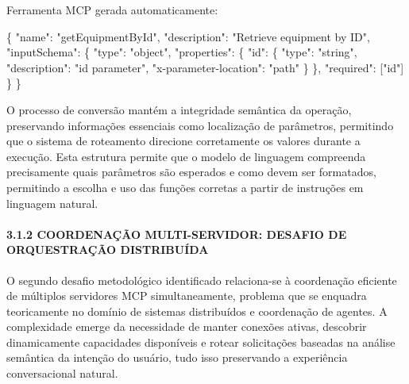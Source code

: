 \documentclass[
]{article}
\newenvironment{Shaded}{}{}
\newcommand{\DataTypeTok}[1]{\textcolor[rgb]{0.56,0.13,0.00}{#1}}
\newcommand{\FunctionTok}[1]{\textcolor[rgb]{0.02,0.16,0.49}{#1}}
\newcommand{\OtherTok}[1]{\textcolor[rgb]{0.00,0.44,0.13}{#1}}
\newcommand{\StringTok}[1]{\textcolor[rgb]{0.25,0.44,0.63}{#1}}
\begin{document}
Ferramenta MCP gerada automaticamente:

\begin{Shaded}
\begin{Highlighting}[]
\FunctionTok{\{}
  \DataTypeTok{"name"}\FunctionTok{:} \StringTok{"getEquipmentById"}\FunctionTok{,}
  \DataTypeTok{"description"}\FunctionTok{:} \StringTok{"Retrieve equipment by ID"}\FunctionTok{,}
  \DataTypeTok{"inputSchema"}\FunctionTok{:} \FunctionTok{\{}
    \DataTypeTok{"type"}\FunctionTok{:} \StringTok{"object"}\FunctionTok{,}
    \DataTypeTok{"properties"}\FunctionTok{:} \FunctionTok{\{}
      \DataTypeTok{"id"}\FunctionTok{:} \FunctionTok{\{}
        \DataTypeTok{"type"}\FunctionTok{:} \StringTok{"string"}\FunctionTok{,}
        \DataTypeTok{"description"}\FunctionTok{:} \StringTok{"id parameter"}\FunctionTok{,}
        \DataTypeTok{"x{-}parameter{-}location"}\FunctionTok{:} \StringTok{"path"}
      \FunctionTok{\}}
    \FunctionTok{\},}
    \DataTypeTok{"required"}\FunctionTok{:} \OtherTok{[}\StringTok{"id"}\OtherTok{]}
  \FunctionTok{\}}
\FunctionTok{\}}
\end{Highlighting}
\end{Shaded}

O processo de conversão mantém a integridade semântica da operação,
preservando informações essenciais como localização de parâmetros,
permitindo que o sistema de roteamento direcione corretamente os valores
durante a execução. Esta estrutura permite que o modelo de linguagem
compreenda precisamente quais parâmetros são esperados e como devem ser
formatados, permitindo a escolha e uso das funções corretas a partir de
instruções em linguagem natural.

\paragraph{3.1.2 COORDENAÇÃO MULTI-SERVIDOR: DESAFIO DE ORQUESTRAÇÃO
DISTRIBUÍDA}\label{coordenauxe7uxe3o-multi-servidor-desafio-de-orquestrauxe7uxe3o-distribuuxedda}

O segundo desafio metodológico identificado relaciona-se à coordenação
eficiente de múltiplos servidores MCP simultaneamente, problema que se
enquadra teoricamente no domínio de sistemas distribuídos e coordenação
de agentes. A complexidade emerge da necessidade de manter conexões
ativas, descobrir dinamicamente capacidades disponíveis e rotear
solicitações baseadas na análise semântica da intenção do usuário, tudo
isso preservando a experiência conversacional natural.
\end{document}
